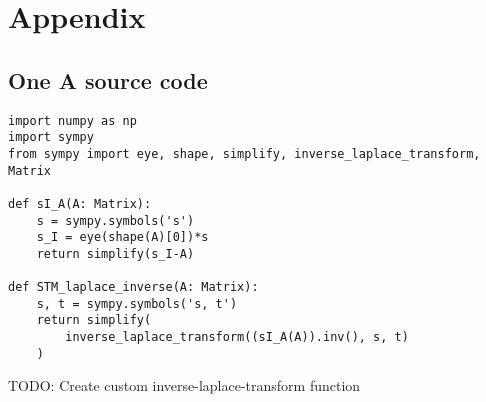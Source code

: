 \appendix

\section{Appendix}
\subsection{One A source code} \label{appendix:one-a-src}
\begin{verbatim}
import numpy as np
import sympy
from sympy import eye, shape, simplify, inverse_laplace_transform, Matrix

def sI_A(A: Matrix):
    s = sympy.symbols('s')
    s_I = eye(shape(A)[0])*s
    return simplify(s_I-A)

def STM_laplace_inverse(A: Matrix):
    s, t = sympy.symbols('s, t')
    return simplify(
        inverse_laplace_transform((sI_A(A)).inv(), s, t)
    )
\end{verbatim}

{\LARGE \color{red} TODO: Create custom inverse-laplace-transform function}
